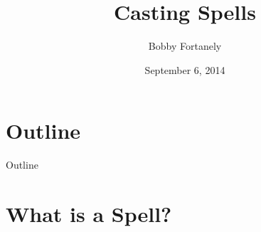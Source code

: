 \documentclass[utf8x]{beamer}
\begin{document}
  
\title{Casting Spells}
\date{September 6, 2014}
\author{Bobby Fortanely}

\begin{frame}
  \titlepage
\end{frame}
  
\section*{Outline}
  \begin{frame}{Outline}
    \tableofcontents
  \end{frame}
\section{What is a Spell?}
  \subsection*{}
  
\end{document}
